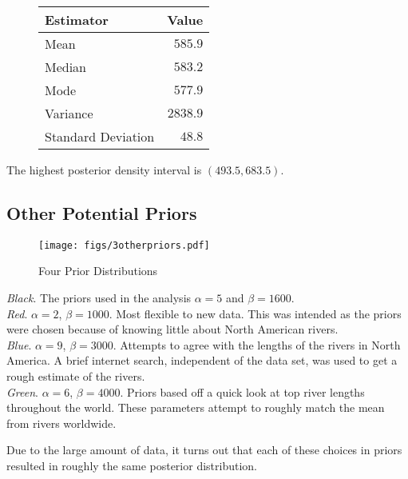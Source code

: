 \documentclass[12pt]{article}
\begin{document}
\begin{figure}[H]
\begin{center}
\begin{tabular}{l|r}
Estimator & \multicolumn{1}{l}{Value} \\ \hline \hline
Mean               & $585.9$ \\
Median             & $583.2$ \\
Mode               & $577.9$ \\
Variance           & $2838.9$ \\
Standard Deviation & $48.8$ \\
\end{tabular}
\end{center}
\end{figure}

\noindent The highest posterior density interval is $(493.5, 683.5)$.

\subsection{Other Potential Priors}

\begin{figure}[H]
\begin{center}
\texttt{[image: figs/3otherpriors.pdf]}
\caption{Four Prior Distributions}
\end{center}
\end{figure}

\noindent \textit{Black}.  The priors used in the analysis $\alpha=5$ and $\beta=1600$. \\ [-0.3cm]

\noindent \textit{Red}. $\alpha=2$, $\beta=1000$.  Most flexible to new data.  This was intended as the priors were chosen because of knowing little about North American rivers. \\ [-0.3cm]

\noindent \textit{Blue}. $\alpha=9$, $\beta=3000$.  Attempts to agree with the lengths of the rivers in North America.  A brief internet search, independent of the data set, was used to get a rough estimate of the rivers. \\ [-0.3cm]

\noindent \textit{Green}. $\alpha=6$, $\beta=4000$.  Priors based off a quick look at top river lengths throughout the world.  These parameters attempt to roughly match the mean from rivers worldwide.
\bigskip

\noindent Due to the large amount of data, it turns out that each of these choices in priors resulted in roughly the same posterior distribution.
\end{document}
